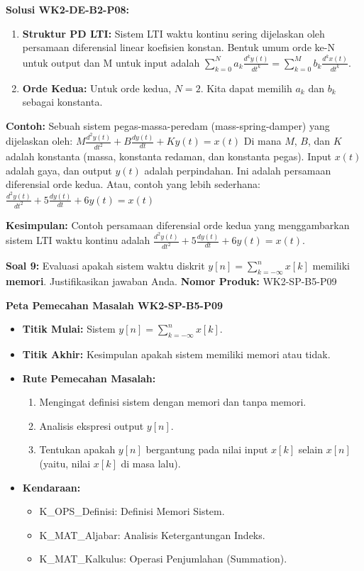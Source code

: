 \documentclass[
  letterpaper,
  DIV=11,
  numbers=noendperiod]{scrreprt}
\providecommand{\tightlist}{%
  \setlength{\itemsep}{0pt}\setlength{\parskip}{0pt}}
\begin{document}
\textbf{Solusi WK2-DE-B2-P08:}

\begin{enumerate}
\def\labelenumi{\arabic{enumi}.}
\tightlist
\item
  \textbf{Struktur PD LTI:} Sistem LTI waktu kontinu sering dijelaskan
  oleh persamaan diferensial linear koefisien konstan. Bentuk umum orde
  ke-N untuk output dan M untuk input adalah
  \(\sum_{k=0}^{N} a_k \frac{d^k y(t)}{dt^k} = \sum_{k=0}^{M} b_k \frac{d^k x(t)}{dt^k}\).
\item
  \textbf{Orde Kedua:} Untuk orde kedua, \(N=2\). Kita dapat memilih
  \(a_k\) dan \(b_k\) sebagai konstanta.
\end{enumerate}

\textbf{Contoh:} Sebuah sistem pegas-massa-peredam (mass-spring-damper)
yang dijelaskan oleh:
\(M \frac{d^2 y(t)}{dt^2} + B \frac{dy(t)}{dt} + K y(t) = x(t)\) Di mana
\(M\), \(B\), dan \(K\) adalah konstanta (massa, konstanta redaman, dan
konstanta pegas). Input \(x(t)\) adalah gaya, dan output \(y(t)\) adalah
perpindahan. Ini adalah persamaan diferensial orde kedua. Atau, contoh
yang lebih sederhana:
\(\frac{d^2 y(t)}{dt^2} + 5 \frac{dy(t)}{dt} + 6 y(t) = x(t)\)

\textbf{Kesimpulan:} Contoh persamaan diferensial orde kedua yang
menggambarkan sistem LTI waktu kontinu adalah
\textbf{\(\frac{d^2 y(t)}{dt^2} + 5 \frac{dy(t)}{dt} + 6 y(t) = x(t)\)}.

\textbf{Soal 9:} Evaluasi apakah sistem waktu diskrit
\(y[n] = \sum_{k=-\infty}^{n} x[k]\) memiliki \textbf{memori}.
Justifikasikan jawaban Anda. \textbf{Nomor Produk:} WK2-SP-B5-P09

\textbf{Peta Pemecahan Masalah WK2-SP-B5-P09}

\begin{itemize}
\tightlist
\item
  \textbf{Titik Mulai:} Sistem \(y[n] = \sum_{k=-\infty}^{n} x[k]\).
\item
  \textbf{Titik Akhir:} Kesimpulan apakah sistem memiliki memori atau
  tidak.
\item
  \textbf{Rute Pemecahan Masalah:}

  \begin{enumerate}
  \def\labelenumi{\arabic{enumi}.}
  \tightlist
  \item
    Mengingat definisi sistem dengan memori dan tanpa memori.
  \item
    Analisis ekspresi output \(y[n]\).
  \item
    Tentukan apakah \(y[n]\) bergantung pada nilai input \(x[k]\) selain
    \(x[n]\) (yaitu, nilai \(x[k]\) di masa lalu).
  \end{enumerate}
\item
  \textbf{Kendaraan:}

  \begin{itemize}
  \tightlist
  \item
    K\_OPS\_Definisi: Definisi Memori Sistem.
  \item
    K\_MAT\_Aljabar: Analisis Ketergantungan Indeks.
  \item
    K\_MAT\_Kalkulus: Operasi Penjumlahan (Summation).
  \end{itemize}
\end{itemize}
\end{document}
